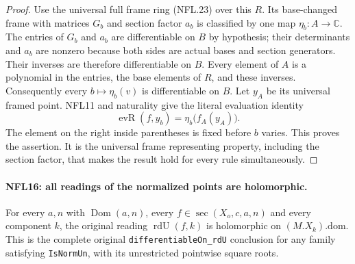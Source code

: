 \begin{proof}
Use the universal full frame ring (NFL.23) over this $R$.
Its base-changed frame with matrices $G_b$ and section factor
$a_b$ is classified by one map $\eta_b:A\to\mathbb C$.
The entries of $G_b$ and $a_b$ are differentiable on $B$ by hypothesis;
their determinants and $a_b$ are nonzero because both sides
are actual bases and section generators.  Their inverses
are therefore differentiable on $B$.  Every element of $A$ is a
polynomial in the entries, the base elements of $R$, and these
inverses.  Consequently every $b\mapsto\eta_b(v)$ is differentiable on $B$.
Let $y_A$ be its universal framed point.  NFL11 and naturality
give the literal evaluation identity
\[
 \operatorname{evR}(f,y_b)=\eta_b\bigl(f_A(y_A)\bigr).
\]
The element on the right inside parentheses is fixed before
$b$ varies.  This proves the assertion.  It is the universal
frame representing property, including the section factor,
that makes the result hold for every rule simultaneously.
\end{proof}

\paragraph{NFL16: all readings of the normalized points are holomorphic.}
\label{claim:NFL16}
For every $a,n$ with $\operatorname{Dom}(a,n)$, every
$f\in\operatorname{sec}(X_o,c,a,n)$ and every component $k$,
the original reading $\operatorname{rdU}(f,k)$ is holomorphic
on $(M.X_k).\mathrm{dom}$.  This is the complete original
\texttt{differentiableOn\_rdU} conclusion for any family satisfying
\texttt{IsNormUn}, with its unrestricted pointwise square roots.

